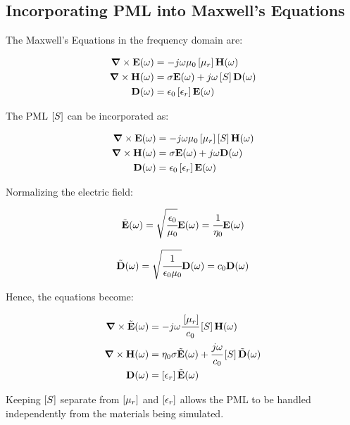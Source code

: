\subsection{Incorporating PML into Maxwell's Equations}

The Maxwell's Equations in the frequency domain are:

\begin{align}
    \rot \E (\omega) &= -j\omega \mu_0 \brackets{\mu_r} \Hh (\omega) \\
    \rot \Hh (\omega) &= \sigma \E(\omega) + j\omega\brackets{S} \D (\omega) \\
    \D (\omega) &= \epsilon_0 \brackets{\epsilon _r}\E (\omega)
\end{align}

The PML $\brackets{S}$ can be incorporated as:

\begin{align}
    \rot \E (\omega) &= -j\omega \mu_0 \brackets{\mu_r} \brackets{S} \Hh (\omega) \\
    \rot \Hh (\omega) &= \sigma \E(\omega) + j\omega \D (\omega) \\
    \D (\omega) &= \epsilon_0 \brackets{\epsilon _r} \E (\omega)
\end{align}

Normalizing the electric field:

\begin{equation}
    \tilde{\textbf{E}}(\omega) = \sqrt{\cfrac{\epsilon_0}{\mu_0}}\textbf{E}(\omega) = \cfrac{1}{\eta_0}\textbf{E}(\omega)
\end{equation}

\begin{equation}
    \tilde{\textbf{D}}(\omega) = \sqrt{\cfrac{1}{\epsilon_0\mu_0}} \textbf{D}(\omega) = c_0 \textbf{D}(\omega)
\end{equation}

Hence, the equations become:

\begin{align}
    \rot \Enw (\omega) &= -j\omega\cfrac{\brackets{\mu_r}}{c_0} \brackets{S} \Hh (\omega) \\
    \rot \Hh (\omega) &= \eta_0 \sigma \Enw(\omega) + \cfrac{j\omega}{c_0}\brackets{S} \Dnw (\omega) \\
    \D (\omega) &= \brackets{\epsilon _r} \Enw (\omega)
\end{align}

Keeping $\brackets{S}$ separate from $\brackets{\mu_r}$ and $\brackets{\epsilon_r}$ allows the PML to be handled independently from the materials being simulated.

